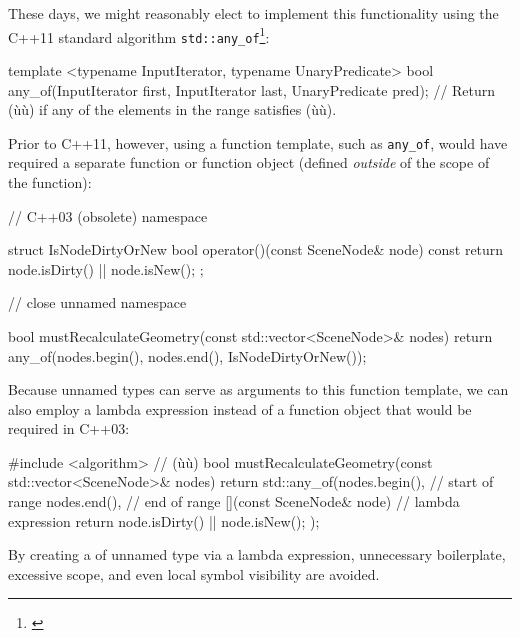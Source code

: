 These days, we might reasonably elect to implement this functionality
using the C++11 standard algorithm
\lstinline!std::any_of!{\cprotect\footnote{\cite{cpprefa}}}:

\begin{emcppslisting}[language=C++]
template <typename InputIterator, typename UnaryPredicate>
bool any_of(InputIterator first, InputIterator last, UnaryPredicate pred);
    // Return (ù{}ù) if any of the elements in the range satisfies (ù{}ù).
\end{emcppslisting}

\noindent Prior to C++11, however, using a function template, such as
\lstinline!any_of!, would have required a separate function or
function object (defined \emph{outside} of the scope of the function):

\begin{emcppslisting}[language=C++]
// C++03 (obsolete)
namespace {

struct IsNodeDirtyOrNew
{
    bool operator()(const SceneNode& node) const
    {
        return node.isDirty() || node.isNew();
    }
};

}  // close unnamed namespace

bool mustRecalculateGeometry(const std::vector<SceneNode>& nodes)
{
    return any_of(nodes.begin(), nodes.end(), IsNodeDirtyOrNew());
}
\end{emcppslisting}

\noindent Because unnamed types can serve as arguments to this function template, we can also employ a lambda expression instead of a function object that would be required in C++03:

\begin{emcppslisting}[language=C++]
#include <algorithm> // (ù{}ù)
bool mustRecalculateGeometry(const std::vector<SceneNode>& nodes)
{
    return std::any_of(nodes.begin(),             // start of range
                       nodes.end(),               // end of range
                       [](const SceneNode& node)  // lambda expression
                       {
                           return node.isDirty() || node.isNew();
                       }
                      );
}
\end{emcppslisting}

\noindent By creating a  of unnamed type via a lambda
expression, unnecessary boilerplate, excessive scope, and even local
symbol visibility are avoided.

